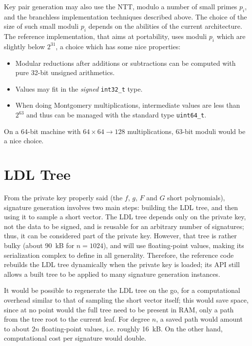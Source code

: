 Key pair generation may also use the NTT, modulo a number of small
primes $p_i$, and the branchless implementation techniques described
above. The choice of the size of such small moduli $p_i$ depends on
the abilities of the current architecture. The \falcon reference
implementation, that aims at portability, uses moduli $p_i$ which
are slightly below $2^{31}$, a choice which has some nice properties:
\begin{itemize}
  \item Modular reductions after additions or subtractions can be
  computed with pure 32-bit unsigned arithmetics.
  \item Values may fit in the \emph{signed} \verb+int32_t+ type.
  \item When doing Montgomery multiplications, intermediate values
  are less than $2^{63}$ and thus can be managed with the standard
  type \verb+uint64_t+.
\end{itemize}
On a 64-bit machine with $64\times 64\rightarrow 128$ multiplications,
63-bit moduli would be a nice choice.

\section{LDL Tree}

From the private key properly said (the $f$, $g$, $F$ and $G$ short
polynomials), signature generation involves two main steps: building the
LDL tree, and then using it to sample a short vector. The LDL tree
depends only on the private key, not the data to be signed, and is
reusable for an arbitrary number of signatures; thus, it can be
considered part of the private key. However, that tree is rather bulky
(about 90~kB for $n = 1024$), and will use floating-point values, making
its serialization complex to define in all generality. Therefore, the
\falcon reference code rebuilds the LDL tree dynamically when the
private key is loaded; its API still allows a built tree to be applied
to many signature generation instances.

It would be possible to regenerate the LDL tree on the go, for a
computational overhead similar to that of sampling the short vector
itself; this would save space, since at no point would the full tree
need to be present in RAM, only a path from the tree root to the current
leaf. For degree $n$, a saved path would amount to about $2n$
floating-point values, i.e. roughly 16~kB. On the other hand,
computational cost per signature would double.

